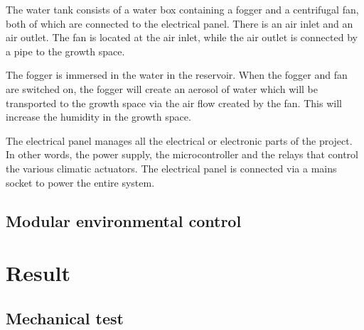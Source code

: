 The water tank consists of a water box containing a fogger and a centrifugal fan, both of which are connected to the electrical panel. There is an air inlet and an air outlet. The fan is located at the air inlet, while the air outlet is connected by a pipe to the growth space.

The fogger is immersed in the water in the reservoir. When the fogger and fan are switched on, the fogger will create an aerosol of water which will be transported to the growth space via the air flow created by the fan. This will increase the humidity in the growth space.

The electrical panel manages all the electrical or electronic parts of the project. In other words, the power supply, the microcontroller and the relays that control the various climatic actuators. The electrical panel is connected via a mains socket to power the entire system.
\subsection{Modular environmental control}



\section{Result}
\subsection{Mechanical test}






